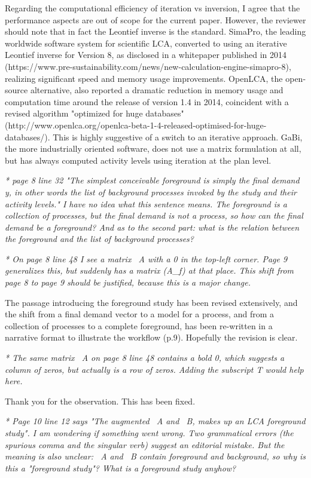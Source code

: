 \documentclass[11pt,letterpaper]{article}
\begin{document}
Regarding the computational efficiency of iteration vs inversion, I agree that the performance aspects are out of scope for the current paper.  However, the reviewer should note that in fact the Leontief inverse is the standard.  SimaPro, the leading worldwide software system for scientific LCA, converted to using an iterative Leontief inverse for Version 8, as disclosed in a whitepaper published in 2014 (https://www.pre-sustainability.com/news/new-calculation-engine-simapro-8), realizing significant speed and memory usage improvements.  OpenLCA, the open-source alternative, also reported a dramatic reduction in memory usage and computation time around the release of version 1.4 in 2014, coincident with a revised algorithm "optimized for huge databases" (http://www.openlca.org/openlca-beta-1-4-released-optimised-for-huge-databases/). This is highly suggestive of a switch to an iterative approach.  GaBi, the more industrially oriented software, does not use a matrix formulation at all, but has always computed activity levels using iteration at the plan level.  

\emph{* page 8 line 32 "The simplest conceivable foreground is simply the final demand y, in other words the list of background processes invoked by the study and their activity levels." I have no idea what this sentence means. The foreground is a collection of processes, but the final demand is not a process, so how can the final demand be a foreground? And as to the second part: what is the relation between the foreground and the list of background processes?}

\emph{* On page 8 line 48 I see a matrix ~A with a 0 in the top-left corner. Page 9 generalizes this, but suddenly has a matrix (A\_f) at that place. This shift from page 8 to page 9 should be justified, because this is a major change.}

The passage introducing the foreground study has been revised extensively, and the shift from a final demand vector to a model for a process, and from a collection of processes to a complete foreground, has been re-written in a narrative format to illustrate the workflow (p.9).  Hopefully the revision is clear.

\emph{* The same matrix ~A on page 8 line 48 contains a bold 0, which suggests a column of zeros, but actually is a row of zeros. Adding the subscript T would help here.}

Thank you for the observation.  This has been fixed.

\emph{* Page 10 line 12 says "The augmented ~A and ~B, makes up an LCA foreground study". I am wondering if something went wrong. Two grammatical errors (the spurious comma and the singular verb) suggest an editorial mistake. But the meaning is also unclear: ~A and ~B contain foreground and background, so why is this a "foreground study"? What is a foreground study anyhow?}
\end{document}
